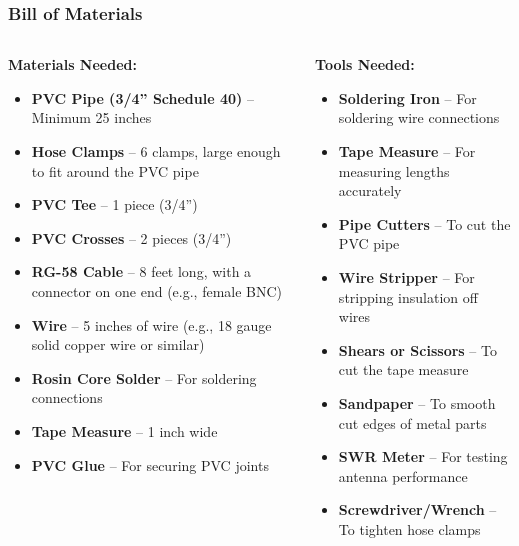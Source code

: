 \documentclass{beamer}
\begin{document}
\begin{frame}
    \frametitle{Bill of Materials}
    \scriptsize %
    
    \begin{columns}
        \begin{column}{0.5\textwidth}
            \textbf{Materials Needed:}
            \begin{itemize}
                \item \textbf{PVC Pipe (3/4” Schedule 40)} – Minimum 25 inches
                \item \textbf{Hose Clamps} – 6 clamps, large enough to fit around the PVC pipe
                \item \textbf{PVC Tee} – 1 piece (3/4”)
                \item \textbf{PVC Crosses} – 2 pieces (3/4”)
                \item \textbf{RG-58 Cable} – 8 feet long, with a connector on one end (e.g., female BNC)
                \item \textbf{Wire} – 5 inches of wire (e.g., 18 gauge solid copper wire or similar)
                \item \textbf{Rosin Core Solder} – For soldering connections
                \item \textbf{Tape Measure} – 1 inch wide
                \item \textbf{PVC Glue} – For securing PVC joints
            \end{itemize}
        \end{column}
        
        \begin{column}{0.5\textwidth}
            \textbf{Tools Needed:}
            \begin{itemize}
                \item \textbf{Soldering Iron} – For soldering wire connections
                \item \textbf{Tape Measure} – For measuring lengths accurately
                \item \textbf{Pipe Cutters} – To cut the PVC pipe
                \item \textbf{Wire Stripper} – For stripping insulation off wires
                \item \textbf{Shears or Scissors} – To cut the tape measure
                \item \textbf{Sandpaper} – To smooth cut edges of metal parts
                \item \textbf{SWR Meter} – For testing antenna performance
                \item \textbf{Screwdriver/Wrench} – To tighten hose clamps
            \end{itemize}
        \end{column}
    \end{columns}
\end{frame}
\end{document}
